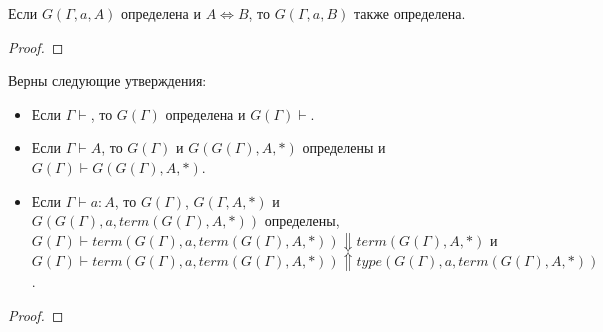 \documentclass{amsart}
\theoremstyle{definition}
\theoremstyle{remark}
\newcommand{\deq}{\Leftrightarrow}
\numberwithin{figure}{section}
\begin{document}
\begin{lem}
Если $G(\Gamma, a, A)$ определена и $A \deq B$, то $G(\Gamma, a, B)$ также определена.
\end{lem}
\begin{proof}
\end{proof}

\begin{prop}
Верны следующие утверждения:
\begin{itemize}
\item Если $\Gamma \vdash$, то $G(\Gamma)$ определена и $G(\Gamma) \vdash$.
\item Если $\Gamma \vdash A$, то $G(\Gamma)$ и $G(G(\Gamma), A, *)$ определены и $G(\Gamma) \vdash G(G(\Gamma), A, *)$.
\item Если $\Gamma \vdash a : A$, то $G(\Gamma)$, $G(\Gamma, A, *)$ и $G(G(\Gamma), a, term(G(\Gamma), A, *))$ определены, $G(\Gamma) \vdash term(G(\Gamma), a, term(G(\Gamma), A, *)) \Downarrow term(G(\Gamma), A, *)$ и $G(\Gamma) \vdash term(G(\Gamma), a, term(G(\Gamma), A, *)) \Uparrow type(G(\Gamma), a, term(G(\Gamma), A, *))$.
\end{itemize}
\end{prop}
\begin{proof}
\end{proof}
\end{document}
